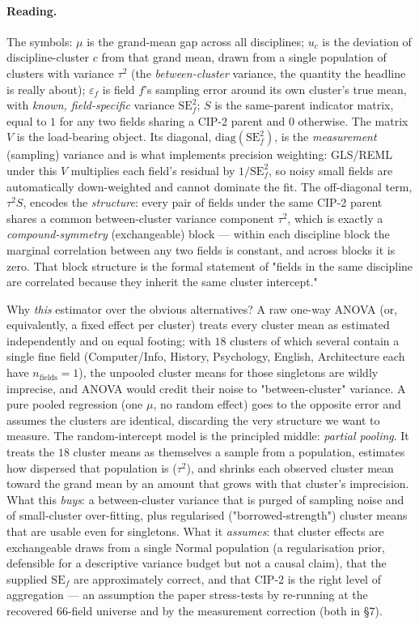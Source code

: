 \documentclass[11pt]{article}
\begin{document}
\paragraph{Reading.} The symbols: $\mu$ is the grand-mean gap across all disciplines; $u_{c}$ is the deviation of discipline-cluster $c$ from that grand mean, drawn from a single population of clusters with variance $\tau^2$ (the \emph{between-cluster} variance, the quantity the headline is really about); $\varepsilon_f$ is field $f$'s sampling error around its own cluster's true mean, with \emph{known, field-specific} variance $\mathrm{SE}_f^2$; $S$ is the same-parent indicator matrix, equal to $1$ for any two fields sharing a CIP-2 parent and $0$ otherwise. The matrix $V$ is the load-bearing object. Its diagonal, $\mathrm{diag}(\mathrm{SE}_f^2)$, is the \emph{measurement} (sampling) variance and is what implements precision weighting: GLS/REML under this $V$ multiplies each field's residual by $1/\mathrm{SE}_f^2$, so noisy small fields are automatically down-weighted and cannot dominate the fit. The off-diagonal term, $\tau^2 S$, encodes the \emph{structure}: every pair of fields under the same CIP-2 parent shares a common between-cluster variance component $\tau^2$, which is exactly a \emph{compound-symmetry} (exchangeable) block --- within each discipline block the marginal correlation between any two fields is constant, and across blocks it is zero. That block structure is the formal statement of "fields in the same discipline are correlated because they inherit the same cluster intercept."

Why \emph{this} estimator over the obvious alternatives? A raw one-way ANOVA (or, equivalently, a fixed effect per cluster) treats every cluster mean as estimated independently and on equal footing; with $18$ clusters of which several contain a single fine field (Computer/Info, History, Psychology, English, Architecture each have $n_{\text{fields}}=1$), the unpooled cluster means for those singletons are wildly imprecise, and ANOVA would credit their noise to "between-cluster" variance. A pure pooled regression (one $\mu$, no random effect) goes to the opposite error and assumes the clusters are identical, discarding the very structure we want to measure. The random-intercept model is the principled middle: \emph{partial pooling}. It treats the $18$ cluster means as themselves a sample from a population, estimates how dispersed that population is ($\tau^2$), and shrinks each observed cluster mean toward the grand mean by an amount that grows with that cluster's imprecision. What this \emph{buys}: a between-cluster variance that is purged of sampling noise and of small-cluster over-fitting, plus regularised ("borrowed-strength") cluster means that are usable even for singletons. What it \emph{assumes}: that cluster effects are exchangeable draws from a single Normal population (a regularisation prior, defensible for a descriptive variance budget but not a causal claim), that the supplied $\mathrm{SE}_f$ are approximately correct, and that CIP-2 is the right level of aggregation --- an assumption the paper stress-tests by re-running at the recovered $66$-field universe and by the measurement correction (both in \S7).
\end{document}
